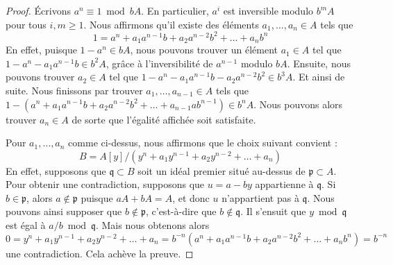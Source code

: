 \begin{proof}
Écrivons $a^n \equiv 1 \bmod bA$. En particulier, $a^i$ est inversible modulo
$b^mA$ pour tous $i, m \geq 1$. Nous affirmons qu'il existe des éléments
$a_1, \ldots, a_n \in A$ tels que
$$
1 = a^n + a_1 a^{n - 1}b + a_2 a^{n - 2}b^2 + \ldots + a_n b^n
$$
En effet, puisque $1 - a^n \in bA$, nous pouvons trouver un élément $a_1 \in A$
tel que $1 - a^n - a_1 a^{n - 1} b \in b^2A$, grâce à l'inversibilité
de $a^{n - 1}$ modulo $bA$. Ensuite, nous pouvons trouver $a_2 \in A$
tel que $1 - a^n - a_1 a^{n - 1} b - a_2 a^{n - 2} b^2 \in b^3A$.
Et ainsi de suite. Nous finissons par trouver $a_1, \ldots, a_{n - 1} \in A$
tels que $1 - (a^n + a_1 a^{n - 1}b + a_2 a^{n - 2}b^2 +
\ldots + a_{n - 1} ab^{n - 1}) \in b^nA$. Nous pouvons alors trouver
$a_n \in A$ de sorte que l'égalité affichée soit satisfaite.

\medskip\noindent
Pour $a_1, \ldots, a_n$ comme ci-dessus, nous affirmons que le choix suivant convient :
$$
B = A[y]/(y^n + a_1 y^{n - 1} + a_2 y^{n - 2} + \ldots + a_n)
$$
En effet, supposons que $\mathfrak q \subset B$ soit un idéal premier
situé au-dessus de $\mathfrak p \subset A$. Pour obtenir une contradiction,
supposons que $u = a - by$ appartienne à $\mathfrak q$. Si $b \in \mathfrak p$,
alors $a \not \in \mathfrak p$ puisque $aA + bA = A$, et donc $u$
n'appartient pas à $\mathfrak q$. Nous pouvons ainsi supposer que $b \not \in \mathfrak p$, c'est-à-dire
que $b \not \in \mathfrak q$. Il s'ensuit que $y \bmod \mathfrak q$
est égal à $a/b \bmod \mathfrak q$. Mais nous obtenons alors
$$
0 = y^n + a_1 y^{n - 1} + a_2 y^{n - 2} + \ldots + a_n =
b^{-n}(a^n + a_1 a^{n - 1}b + a_2 a^{n - 2}b^2 + \ldots + a_nb^n) =
b^{-n}
$$
une contradiction. Cela achève la preuve.
\end{proof}

